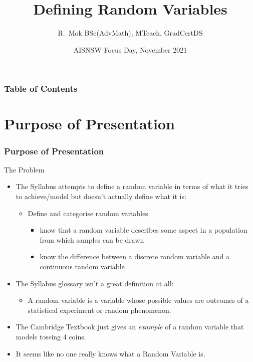 \documentclass{beamer}
\title[Defining Random Variables] %
{Defining Random Variables}
\author[R. Mok] %
{R.~Mok BSc(AdvMath), MTeach, GradCertDS}
\date[November 2021] %
{AISNSW Focus Day, November 2021}
\begin{document}
\frame{\titlepage}


\begin{frame}
\frametitle{Table of Contents}
\tableofcontents
\end{frame}

\section{Purpose of Presentation}


\begin{frame}
\frametitle{Purpose of Presentation}
\begin{block}{The Problem}
\begin{itemize}
  \item<2-> The Syllabus attempts to define a random variable in terms of what it tries to achieve/model but doesn't actually define what it is:
    \begin{itemize}
      \item Define and categorise random variables
        \begin{itemize}
          \item know that a random variable describes some aspect in a population from which samples can be drawn
          \item know the difference between a discrete random variable and a continuous random variable
        \end{itemize}
    \end{itemize}
    \parencite[p.~47]{syllabus}
  \item<3-> The Syllabus glossary isn't a great definition at all:
    \begin{itemize}
      \item A random variable is a variable whose possible values are outcomes of a statistical experiment or random phenomenon.
        \parencite[p.~73]{syllabus}
    \end{itemize}
  \item<4-> The Cambridge Textbook just gives an \emph{example} of a random variable that models tossing 4 coins.
  \item<5-> It seems like no one really knows what a Random Variable is.
\end{itemize}
\end{block}
\end{frame}
\end{document}
